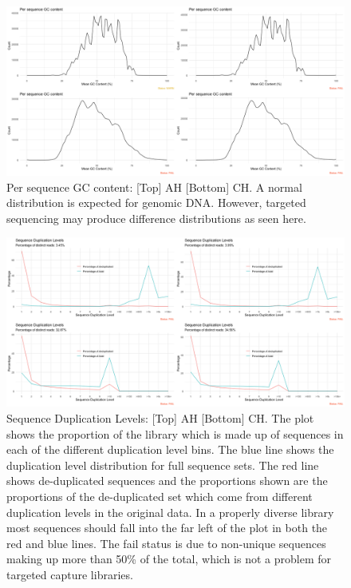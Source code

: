 \documentclass{article}
\begin{document}
\begin{figure}[h] \hspace*{0cm} 
\begin{center}
    \includegraphics[scale=0.25]{fastqcr/p4}
	\caption{Per sequence GC content: [Top] AH [Bottom] CH.
	A normal distribution is expected for genomic DNA. However, targeted sequencing may produce difference distributions as seen here.}
	\label{fig:p4}
\end{center}
\end{figure}

\begin{figure}[h] \hspace*{0cm} 
\begin{center}
    \includegraphics[scale=0.35]{fastqcr/p5}
	\caption{Sequence Duplication Levels:  [Top] AH [Bottom] CH.
	The plot shows the proportion of the library which is made up of sequences in each of the different duplication level bins. 
	The blue line shows the duplication level distribution for full sequence sets. 
	The red line shows de-duplicated sequences and the proportions shown are the proportions of the de-duplicated set which come from different duplication levels in the original data.
In a properly diverse library most sequences should fall into the far left of the plot in both the red and blue lines.
The fail status is due to non-unique sequences making up more than 50\% of the total, which is not a problem for targeted capture libraries.}
	\label{fig:p5}
\end{center}
\end{figure}
\end{document}
